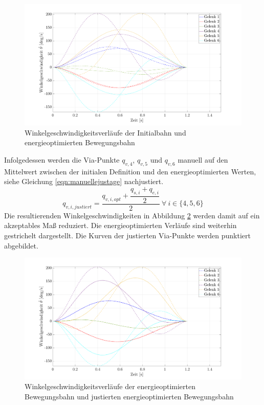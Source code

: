 %
\begin{figure}[tbph]
	\centering
	\includegraphics[width=1\linewidth]{images/Optimierungsergebnisse_up/velopt}
	\caption{Winkelgeschwindigkeitsverläufe der Initialbahn und energieoptimierten Bewegungsbahn}
	\label{fig:velopt}
\end{figure}
%
Infolgedessen werden die Via-Punkte ${q}_{v,4}$, ${q}_{v,5}$ und ${q}_{v,6}$ manuell auf den Mittelwert zwischen der initialen Definition und den energieoptimierten Werten, siehe Gleichung \ref{eqn:manuellejustage} nachjustiert.
%
\begin{equation}
	\label{eqn:manuellejustage}
	{q}_{v,i,justiert} = \dfrac{{q}_{v,i,opt} + \dfrac{q_{s,i}+q_{e,i}}{2}}{2}~\forall~ i \in \{4,5,6\}
\end{equation}
%
Die resultierenden Winkelgeschwindigkeiten in Abbildung \ref{fig:veloptedit} 
werden damit auf ein akzeptables Maß reduziert. 
Die energieoptimierten Verläufe sind weiterhin gestrichelt dargestellt. Die Kurven der justierten Via-Punkte werden punktiert abgebildet.
%
\begin{figure}[tbph]
	\centering
	\includegraphics[width=1\linewidth]{images/Optimierungsergebnisse_up/veloptedit}
	\caption{Winkelgeschwindigkeitsverläufe der energieoptimierten Bewegungsbahn und justierten energieoptimierten Bewegungsbahn}
	\label{fig:veloptedit}
\end{figure}

